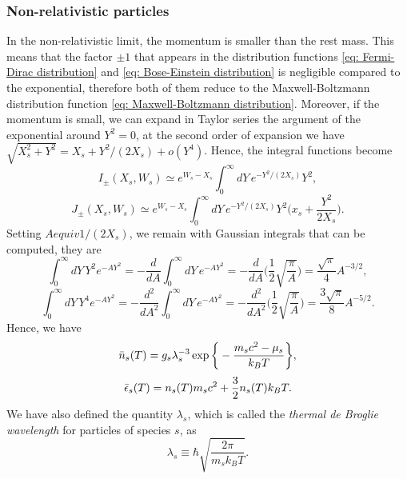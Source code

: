 \subsubsection{Non-relativistic particles}
In the non-relativistic limit, the momentum is smaller than the rest mass. This means that the factor $\pm1$ that appears in the distribution functions \eqref{eq: Fermi-Dirac distribution} and \eqref{eq: Bose-Einstein distribution} is negligible compared to the exponential, therefore both of them reduce to the Maxwell-Boltzmann distribution function \eqref{eq: Maxwell-Boltzmann distribution}. Moreover, if the momentum is small, we can expand in Taylor series the argument of the exponential around $Y^2 = 0$, at the second order of expansion we have $\sqrt{X^2_s + Y^2} = X_s + Y^2/(2X_s) + o(Y^4)$. Hence, the integral functions become 
\begin{equation}
    I_\pm(X_s,W_s) \simeq  e^{W_s - X_s}\int_0^\infty dY\,e^{-Y^2/(2X_s)}Y^2,
\end{equation}
\begin{equation}
    J_\pm(X_s,W_s) \simeq  e^{W_s - X_s}\int_0^\infty dY\,e^{-Y^2/(2X_s)}Y^2\bigg(x_s + \frac{Y^2}{2X_s}\bigg).
\end{equation}
Setting $A equiv 1/(2X_s)$, we remain with Gaussian integrals that can be computed, they are 
\begin{equation}
    \int_0^\infty dY\,Y^2e^{-AY^2} = -\frac{d}{dA}\int_0^\infty dY\,e^{-AY^2} = -\frac{d}{dA}\bigg(\frac{1}{2}\sqrt{\frac{\pi}{A}}) = \frac{\sqrt{\pi}}{4}A^{-3/2},
\end{equation}
\begin{equation}
    \int_0^\infty dY\,Y^4e^{-AY^2} = -\frac{d^2}{dA^2}\int_0^\infty dY\,e^{-AY^2} = -\frac{d^2}{dA^2}\bigg(\frac{1}{2}\sqrt{\frac{\pi}{A}}) = \frac{3\sqrt{\pi}}{8}A^{-5/2}.
\end{equation}
Hence, we have 
\begin{equation}
\label{eq: number density of particles of type s (HU + NRL)}
    \bar{n}_s(T) = g_s\lambda_s^{-3}\exp{\bigg\{-\frac{m_sc^2 - \mu_s}{k_BT}\bigg\}},
\end{equation}
\begin{equation}
\label{eq: energy density of particles of type s (HU + NRL)}
    \bar{\epsilon}_s(T) = n_s(T)m_sc^2 + \frac{3}{2}n_s(T)k_BT.
\end{equation}
We have also defined the quantity $\lambda_s$, which is called the \emph{thermal de Broglie wavelength} for particles of species $s$, as 
\begin{equation}
    \lambda_s \equiv \hbar\sqrt{\frac{2\pi}{m_sk_BT}}.
\end{equation}

